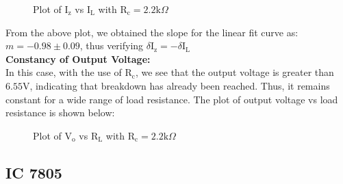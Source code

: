 \documentclass{scrartcl}
\begin{document}
        \noindent
\begin{figure}[H]
        \centering
        
        \caption{Plot of $\mathrm{I_z}$ vs $\mathrm{I_L}$ with $\mathrm{R_c} = 2.2 \mathrm{k}\Omega$}
\end{figure}
\noindent
From the above plot, we obtained the slope for the linear fit curve as: ${m = -0.98\pm0.09}$, thus verifying  $\delta\mathrm{I_z} = - \delta\mathrm{I_L}$ \\[0.3cm]
\textbf{Constancy of Output Voltage:}\\[0.3cm]
In this case, with the use of $\mathrm{R_c}$, we see that the output voltage is greater than $6.55 \mathrm{V}$, indicating that breakdown has already been reached. Thus, it remains constant for a wide range of load resistance. The plot of output voltage vs load resistance is shown below:
\begin{figure}[H]
        \centering
        
        \caption{Plot of $\mathrm{V_o}$ vs $\mathrm{R_L}$ with $\mathrm{R_c} = 2.2 \mathrm{k}\Omega$}
\end{figure}
\subsection{IC 7805}
\end{document}
